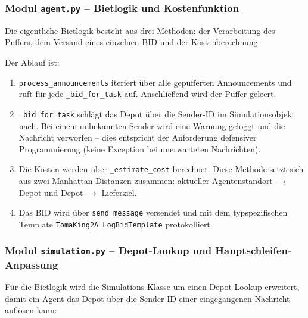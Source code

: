 
\subsubsection{Modul \texttt{agent.py} – Bietlogik und Kostenfunktion}
\label{sssec:agent_bid_2c}

Die eigentliche Bietlogik besteht aus drei Methoden: der Verarbeitung des Puffers, dem Versand eines einzelnen BID und der Kostenberechnung:



Der Ablauf ist:
\begin{enumerate}
    \item \texttt{process\_announcements} iteriert über alle gepufferten Announcements und ruft für jede \texttt{\_bid\_for\_task} auf. Anschließend wird der Puffer geleert.
    \item \texttt{\_bid\_for\_task} schlägt das Depot über die Sender-ID im Simulationsobjekt nach. Bei einem unbekannten Sender wird eine Warnung geloggt und die Nachricht verworfen -- dies entspricht der Anforderung defensiver Programmierung (keine Exception bei unerwarteten Nachrichten).
    \item Die Kosten werden über \texttt{\_estimate\_cost} berechnet. Diese Methode setzt sich aus zwei Manhattan-Distanzen zusammen: aktueller Agentenstandort \(\to\) Depot und Depot \(\to\) Lieferziel.
    \item Das BID wird über \texttt{send\_message} versendet und mit dem typspezifischen Template \texttt{TomaKing2A\_LogBidTemplate} protokolliert.
\end{enumerate}


\subsubsection{Modul \texttt{simulation.py} – Depot-Lookup und Hauptschleifen-Anpassung}

Für die Bietlogik wird die Simulations-Klasse um einen Depot-Lookup erweitert, damit ein Agent das Depot über die Sender-ID einer eingegangenen Nachricht auflösen kann:



